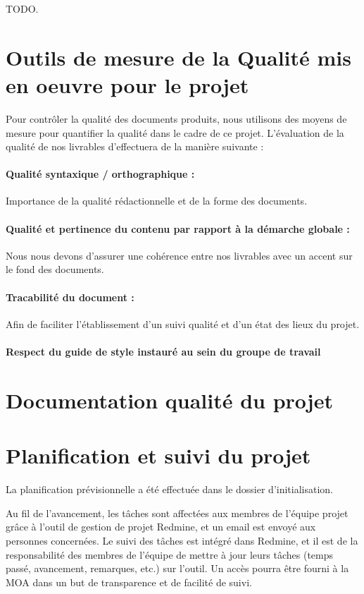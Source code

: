 \documentclass[a4paper, 18pt]{article}
\begin{document}
TODO.

\section{Outils de mesure de la Qualité mis en oeuvre pour le projet}

Pour contrôler la qualité des documents produits, nous utilisons des moyens de mesure pour quantifier la qualité dans le cadre de ce projet. L'évaluation de la qualité de nos livrables d'effectuera de la manière suivante :

\paragraph*{Qualité syntaxique / orthographique :} Importance de la qualité rédactionnelle et de la forme des documents.
\paragraph*{Qualité et pertinence du contenu par rapport à la démarche globale :} Nous nous devons d’assurer une cohérence entre nos livrables avec un accent sur le fond des documents.
\paragraph*{Tracabilité du document :} Afin de faciliter l’établissement d’un suivi qualité et d’un état des lieux du projet.
\paragraph*{Respect du guide de style instauré au sein du groupe de travail}

\section{Documentation qualité du projet}

\section{Planification et suivi du projet }

La planification prévisionnelle a été effectuée dans le dossier d'initialisation.

Au fil de l'avancement, les tâches sont affectées aux membres de l'équipe projet grâce à l'outil de gestion de projet Redmine, et un email est envoyé aux personnes concernées. Le suivi des tâches est intégré dans Redmine, et il est de la responsabilité des membres de l'équipe de mettre à jour leurs tâches (temps passé, avancement, remarques, etc.) sur l'outil. Un accès pourra être fourni à la MOA dans un but de transparence et de facilité de suivi.
\end{document}
